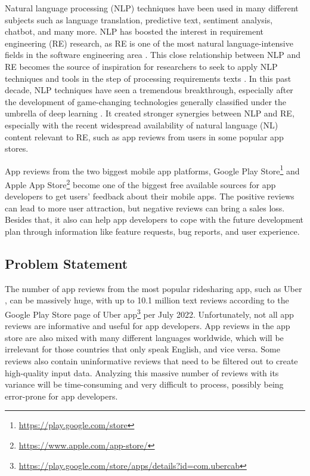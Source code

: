 \documentclass[12pt]{article}
\begin{document}
Natural language processing (NLP) techniques have been used in many different subjects such as language translation\cite{nlp_for_language_translation}, predictive text\cite{nlp_for_predictive_text}, sentiment analysis\cite{nlp_for_sentiment_analysis}, chatbot\cite{nlp_for_chatbot}, and many more. NLP has boosted the interest in requirement engineering (RE) research, as RE is one of the most natural language-intensive fields in the software engineering area \cite{nlp_for_re_2}. This close relationship between NLP and RE becomes the source of inspiration for researchers to seek to apply NLP techniques and tools in the step of processing requirements texts \cite{nlp_for_re}. In this past decade, NLP techniques have seen a tremendous breakthrough, especially after the development of game-changing technologies generally classified under the umbrella of deep learning \cite{trend_deep_learning_nlp}. It created stronger synergies between NLP and RE, especially with the recent widespread availability of natural language (NL) content relevant to RE, such as app reviews from users in some popular app stores.


App reviews from the two biggest mobile app platforms, Google Play Store\footnote{\url{https://play.google.com/store}} and Apple App Store\footnote{\url{https://www.apple.com/app-store/}} become one of the biggest free available sources for app developers to get users’ feedback about their mobile apps. The positive reviews can lead to more user attraction, but negative reviews can bring a sales loss. Besides that, it also can help app developers to cope with the future development plan through information like feature requests, bug reports, and user experience.

\subsection{Problem Statement}
The number of app reviews from the most popular ridesharing app, such as Uber \cite{onde}, can be massively huge, with up to 10.1 million text reviews according to the Google Play Store page of Uber app\footnote{\url{https://play.google.com/store/apps/details?id=com.ubercab}} per July 2022. Unfortunately, not all app reviews are informative and useful for app developers. App reviews in the app store are also mixed with many different languages worldwide, which will be irrelevant for those countries that only speak English, and vice versa. Some reviews also contain uninformative reviews that need to be filtered out to create high-quality input data. Analyzing this massive number of reviews with its variance will be time-consuming and very difficult to process, possibly being error-prone for app developers.
\end{document}

